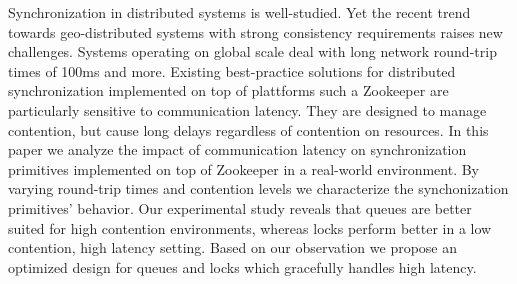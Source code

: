 Synchronization in distributed systems is well-studied. Yet the recent trend towards geo-distributed systems with strong consistency requirements raises new challenges. Systems operating on global scale deal with long network round-trip times of 100ms and more. Existing best-practice solutions for distributed synchronization implemented on top of plattforms such a Zookeeper are particularly sensitive to communication latency. They are designed to manage contention, but cause long delays regardless of contention on resources. In this paper we analyze the impact of communication latency on synchronization primitives implemented on top of Zookeeper in a real-world environment. By varying round-trip times and contention levels we characterize the synchonization primitives' behavior. Our experimental study reveals that queues are better suited for high contention environments, whereas locks perform better in a low contention, high latency setting. Based on our observation we propose an optimized design for queues and locks which gracefully handles high latency.
